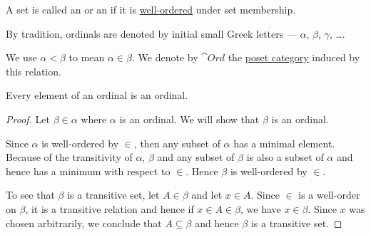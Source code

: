 \medskip

\begin{definition}\label{def:ordinal}
  A set is called an  or an  if it is \hyperref[def:well_ordered_set]{well-ordered} under set membership.

  By tradition, ordinals are denoted by initial small Greek letters --- \( \alpha \), \( \beta \), \( \gamma \), \ldots.

  We use \( \alpha < \beta \) to mean \( \alpha \in \beta \). We denote by \( \cat{Ord} \) the \hyperref[thm:partial_order_category_correspondence]{poset category} induced by this relation.
\end{definition}

\begin{proposition}\label{thm:element_of_ordinal_is_ordinal}
   Every element of an ordinal is an ordinal.
\end{proposition}
\begin{proof}
  Let \( \beta \in \alpha \) where \( \alpha \) is an ordinal. We will show that \( \beta \) is an ordinal.

  Since \( \alpha \) is well-ordered by \( \in \), then any subset of \( \alpha \) has a minimal element. Because of the transitivity of \( \alpha \), \( \beta \) and any subset of \( \beta \) is also a subset of \( \alpha \) and hence has a minimum with respect to \( \in \). Hence \( \beta \) is well-ordered by \( \in \).

  To see that \( \beta \) is a transitive set, let \( A \in \beta \) and let \( x \in A \). Since \( \in \) is a well-order on \( \beta \), it is a transitive relation and hence if \( x \in A \in \beta \), we have \( x \in \beta \). Since \( x \) was chosen arbitrarily, we conclude that \( A \subseteq \beta \) and hence \( \beta \) is a transitive set.
\end{proof}

